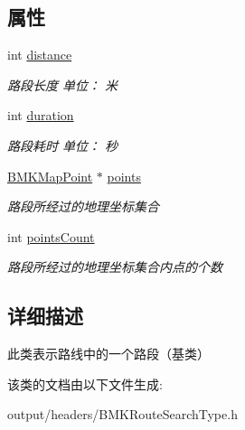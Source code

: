 \subsection*{属性}
\begin{DoxyCompactItemize}
\item 
\hypertarget{interface_b_m_k_route_step_a868b7ecc4313b1c1824a80199012c877}{}int \hyperlink{interface_b_m_k_route_step_a868b7ecc4313b1c1824a80199012c877}{distance}\label{interface_b_m_k_route_step_a868b7ecc4313b1c1824a80199012c877}

\begin{DoxyCompactList}\small\item\em 路段长度 单位： 米 \end{DoxyCompactList}\item 
\hypertarget{interface_b_m_k_route_step_a9c191d3389a169c46e76fb432926855d}{}int \hyperlink{interface_b_m_k_route_step_a9c191d3389a169c46e76fb432926855d}{duration}\label{interface_b_m_k_route_step_a9c191d3389a169c46e76fb432926855d}

\begin{DoxyCompactList}\small\item\em 路段耗时 单位： 秒 \end{DoxyCompactList}\item 
\hypertarget{interface_b_m_k_route_step_aa2faec42865f6254da77039a0729bb6b}{}\hyperlink{struct_b_m_k_map_point}{B\+M\+K\+Map\+Point} $\ast$ \hyperlink{interface_b_m_k_route_step_aa2faec42865f6254da77039a0729bb6b}{points}\label{interface_b_m_k_route_step_aa2faec42865f6254da77039a0729bb6b}

\begin{DoxyCompactList}\small\item\em 路段所经过的地理坐标集合 \end{DoxyCompactList}\item 
\hypertarget{interface_b_m_k_route_step_a58902517ed7dc89918d9b4b9a02dbafa}{}int \hyperlink{interface_b_m_k_route_step_a58902517ed7dc89918d9b4b9a02dbafa}{points\+Count}\label{interface_b_m_k_route_step_a58902517ed7dc89918d9b4b9a02dbafa}

\begin{DoxyCompactList}\small\item\em 路段所经过的地理坐标集合内点的个数 \end{DoxyCompactList}\end{DoxyCompactItemize}


\subsection{详细描述}
此类表示路线中的一个路段（基类） 

该类的文档由以下文件生成\+:\begin{DoxyCompactItemize}
\item 
output/headers/B\+M\+K\+Route\+Search\+Type.\+h\end{DoxyCompactItemize}
